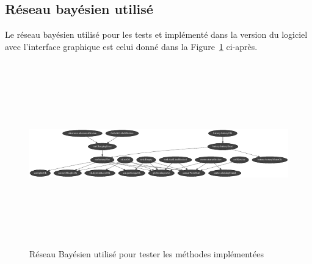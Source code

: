 \documentclass[a4paper,11pt]{article}
\theoremstyle{plain}
\theoremstyle{definition}
\begin{document}
\begin{landscape}
\section{Réseau bayésien utilisé}
\label{AnnexeA}

Le réseau bayésien utilisé pour les tests et implémenté dans la version du logiciel avec l'interface graphique est celui donné dans la Figure~\ref{FigReseauBayes} ci-après.

\vspace*{\fill}

\begin{figure}[ht]
\centering
\includegraphics[width=25.2cm, height=8cm]{Figures/simpleCar2.pdf}
\caption{Réseau Bayésien utilisé pour tester les méthodes implémentées}
\label{FigReseauBayes}
\end{figure}

\vspace*{\fill}

\end{landscape}
\end{document}
